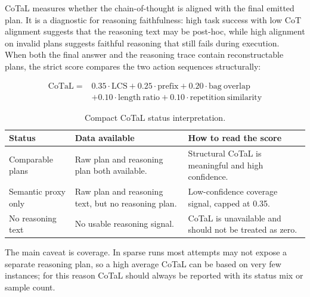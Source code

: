 CoTaL measures whether the chain-of-thought is aligned with the final emitted plan. It is a diagnostic for reasoning faithfulness: high task success with low CoT alignment suggests that the reasoning text may be post-hoc, while high alignment on invalid plans suggests faithful reasoning that still fails during execution.\\
When both the final answer and the reasoning trace contain reconstructable plans, the strict score compares the two action sequences structurally:

\begin{bmformulabox}
\[
\begin{aligned}
\mathrm{CoTaL} ={}& 0.35\cdot\mathrm{LCS} + 0.25\cdot\mathrm{prefix} + 0.20\cdot\mathrm{bag\ overlap}\\
&+ 0.10\cdot\mathrm{length\ ratio} + 0.10\cdot\mathrm{repetition\ similarity}
\end{aligned}
\]
\end{bmformulabox}

\begin{table}[H]\small
\centering
\begin{tabularx}{\linewidth}{@{}l Y Y@{}}
\toprule
\textbf{Status} & \textbf{Data available} & \textbf{How to read the score}\\
\midrule
Comparable plans & Raw plan and reasoning plan both available. & Structural CoTaL is meaningful and high confidence.\\
\addlinespace
Semantic proxy only & Raw plan and reasoning text, but no reasoning plan. & Low-confidence coverage signal, capped at 0.35.\\
\addlinespace
No reasoning text & No usable reasoning signal. & CoTaL is unavailable and should not be treated as zero.\\
\bottomrule
\end{tabularx}
\caption{Compact CoTaL status interpretation.}
\label{tab:cotal-status-compact}
\end{table}

The main caveat is coverage. In sparse runs most attempts may not expose a separate reasoning plan, so a high average CoTaL can be based on very few instances; for this reason CoTaL should always be reported with its status mix or sample count.